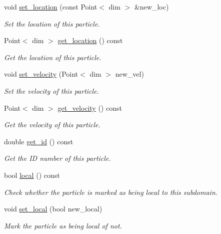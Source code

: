 \begin{DoxyCompactItemize}
void \hyperlink{classps__mmm_1_1_particle_1_1_base_particle_a84ddee6f2cd7a2f8094513953adcf1fc}{set\+\_\+location} (const Point$<$ dim $>$ \&new\+\_\+loc)
\begin{DoxyCompactList}\small\item\em Set the location of this particle. \end{DoxyCompactList}\item 
Point$<$ dim $>$ \hyperlink{classps__mmm_1_1_particle_1_1_base_particle_a2086a9d119060b588d558e61cc085b95}{get\+\_\+location} () const 
\begin{DoxyCompactList}\small\item\em Get the location of this particle. \end{DoxyCompactList}\item 
void \hyperlink{classps__mmm_1_1_particle_1_1_base_particle_adf4700c3b7a61aa772eca1798acd189d}{set\+\_\+velocity} (Point$<$ dim $>$ new\+\_\+vel)
\begin{DoxyCompactList}\small\item\em Set the velocity of this particle. \end{DoxyCompactList}\item 
Point$<$ dim $>$ \hyperlink{classps__mmm_1_1_particle_1_1_base_particle_accb1b8ec80dc4a843b9f4b56f4fb0999}{get\+\_\+velocity} () const 
\begin{DoxyCompactList}\small\item\em Get the velocity of this particle. \end{DoxyCompactList}\item 
double \hyperlink{classps__mmm_1_1_particle_1_1_base_particle_aeb34af650645b0ea82ccaa44f87e70e5}{get\+\_\+id} () const 
\begin{DoxyCompactList}\small\item\em Get the I\+D number of this particle. \end{DoxyCompactList}\item 
bool \hyperlink{classps__mmm_1_1_particle_1_1_base_particle_ac5cf041fb75d56259a3bc62760abf5b5}{local} () const 
\begin{DoxyCompactList}\small\item\em Check whether the particle is marked as being local to this subdomain. \end{DoxyCompactList}\item 
void \hyperlink{classps__mmm_1_1_particle_1_1_base_particle_af368f68aeee1f5f66a52e8338bb3f90d}{set\+\_\+local} (bool new\+\_\+local)
\begin{DoxyCompactList}\small\item\em Mark the particle as being local of not. \end{DoxyCompactList}\item 

\end{DoxyCompactItemize}
